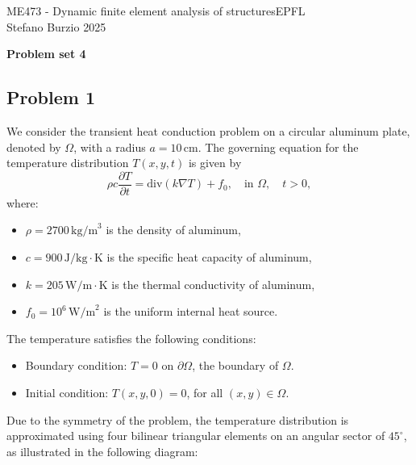 \documentclass[12pt]{article}
\begin{document}
\noindent ME473 - Dynamic finite element analysis of structures\hfill EPFL\\
Stefano Burzio \hfill 2025\\
\vspace{0.3cm}

\hspace*{\fill}\textbf{\Large Problem set 4}\hspace*{\fill}

\hrulefill


\subsection*{Problem 1}
We consider the transient heat conduction problem on a circular aluminum plate, denoted by \(\Omega\), with a radius \(a = 10 \, \text{cm}\). The governing equation for the temperature distribution $T(x,y,t)$ is given by
\begin{equation*}
    \rho c \frac{\partial T}{\partial t} = \text{div} (k \nabla T) + f_0, \quad \text{in } \Omega, \quad t > 0,
\end{equation*}
where:
\begin{itemize}
    \item \(\rho = 2700 \, \text{kg/m}^3\) is the density of aluminum,
    \item \(c = 900 \, \text{J/kg} \cdot \text{K}\) is the specific heat capacity of aluminum,
    \item \(k = 205 \, \text{W/m} \cdot \text{K}\) is the thermal conductivity of aluminum,
    \item \(f_0 = 10^6 \, \text{W/m}^2\) is the uniform internal heat source.
\end{itemize}
The temperature satisfies the following conditions:
\begin{itemize}
    \item Boundary condition: \(T = 0\) on $\partial\Omega$, the boundary of \(\Omega\).
    \item Initial condition: \(T(x, y, 0) = 0\), for all \((x, y) \in \Omega\).
\end{itemize}
Due to the symmetry of the problem, the temperature distribution is approximated using four bilinear triangular elements on an angular sector of \(45^\circ\), as illustrated in the following diagram:
\end{document}
